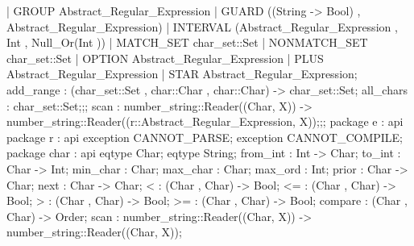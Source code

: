 {{{                                |
                                GROUP
                                Abstract_Regular_Expression
                                |
                                GUARD
                                ((String -> Bool) , Abstract_Regular_Expression)
                                |
                                INTERVAL
                                (Abstract_Regular_Expression , Int , Null_Or(Int ))
                                |
                                MATCH_SET
                                char_set::Set
                                |
                                NONMATCH_SET
                                char_set::Set
                                |
                                OPTION
                                Abstract_Regular_Expression
                                |
                                PLUS
                                Abstract_Regular_Expression
                                |
                                STAR
                                Abstract_Regular_Expression;
                            add_range : (char_set::Set , char::Char , char::Char) -> char_set::Set;
                            all_chars : char_set::Set;};;
                    scan :
                    number_string::Reader((Char, X)) -> number_string::Reader((r::Abstract_Regular_Expression, X));};;
        package e
          : api {   package r
                      : api {
                            exception CANNOT_PARSE;
                            exception CANNOT_COMPILE;
                                package char
                                  : api {
                                        eqtype Char;
                                        eqtype String;
                                        from_int : Int -> Char;
                                        to_int : Char -> Int;
                                        min_char : Char;
                                        max_char : Char;
                                        max_ord : Int;
                                        prior : Char -> Char;
                                        next : Char -> Char;
                                        < : (Char , Char) -> Bool;
                                        <= : (Char , Char) -> Bool;
                                        > : (Char , Char) -> Bool;
                                        >= : (Char , Char) -> Bool;
                                        compare : (Char , Char) -> Order;
                                        scan : number_string::Reader((Char, X)) -> number_string::Reader((Char, X));
}}}}
